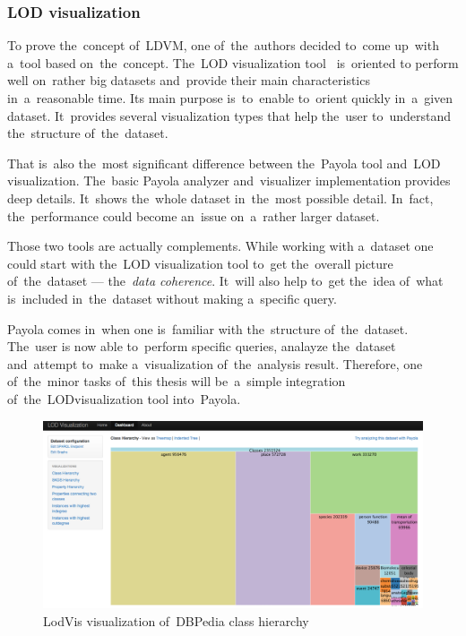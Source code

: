 \subsubsection{LOD visualization}
\label{rw:lodvis}
To prove the~concept of~LDVM, one of~the~authors decided to~come up~with a~tool 
based on~the~concept. The~LOD visualization tool~\cite{lodvis} is~oriented
to perform well on~rather big datasets and~provide their main characteristics in~a~reasonable time. Its main purpose is~to~enable to~orient quickly in~a~given dataset. It~provides several 
visualization types that help the~user to~understand the~structure of~the~dataset.

That is~also the~most significant difference between the~Payola tool and~LOD 
visualization. The~basic Payola analyzer and~visualizer implementation provides 
deep details. It~shows the~whole dataset in~the~most possible detail. In~fact, 
the~performance could become an~issue on~a~rather larger dataset.

Those two tools are actually complements. While working with a~dataset one could 
start with the~LOD visualization tool to~get the~overall picture of~the~dataset --- 
the~\emph{data coherence}. It~will also help to~get the~idea of~what is~included in~the~dataset without making a~specific query.

Payola comes in~when one is~familiar with the~structure of~the~dataset. The~user 
is now able to~perform specific queries, analayze the~dataset and~attempt to~make a~visualization of~the~analysis result. Therefore, one of~the~minor tasks of~this thesis
will be~a~simple integration of~the~LODvisualization tool into~Payola.

\begin{figure}
	\centering
	\includegraphics[width=140mm]{img/lodvis.png}
	\caption{LodVis visualization of~DBPedia class hierarchy}
	\label{fig:lodvis}
\end{figure}

